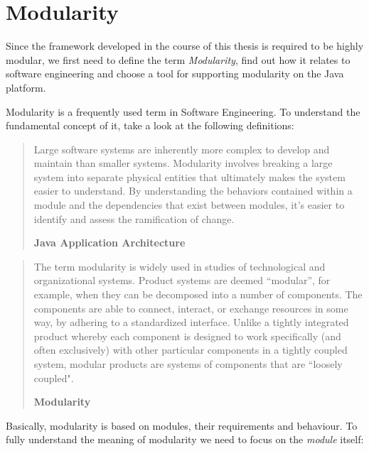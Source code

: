 \section{Modularity}
\label{sec:modularity}


Since the framework developed in the course of this thesis is required to be highly modular, we first need to define the term \textit{Modularity}, find out how it relates to software engineering and choose a tool for supporting modularity on the Java platform.

Modularity is a frequently used term in Software Engineering. To understand the fundamental concept of it, take a look at the following definitions:

\begin{quote}
Large software systems are inherently more complex to develop and maintain than smaller systems. Modularity involves breaking a large system into separate physical entities that ultimately makes the system easier to understand. By understanding the behaviors contained within a module and the dependencies that exist between modules, it’s easier to identify and assess the ramification of change.

\hfill \textbf{Java Application Architecture}

\hfill \citeauthor{Knoernschild:2012} \cite{Knoernschild:2012}
\end{quote}

\begin{quote}
The term modularity is widely used in studies of technological and organizational systems. Product systems are deemed “modular”, for example, when they can be decomposed into a number of components. The components are able to connect, interact, or exchange resources in some way, by adhering to a standardized interface. Unlike a tightly integrated product whereby each component is designed to work specifically (and often exclusively) with other particular components in a tightly coupled system, modular products are systems of components that are “loosely coupled".

\hfill \textbf{Modularity}

\hfill \citeauthor{Wikipedia:Modularity:2012} \cite{Wikipedia:Modularity:2012}
\end{quote}

Basically, modularity is based on modules, their requirements and behaviour. To fully understand the meaning of modularity we need to focus on the \textit{module} itself:

